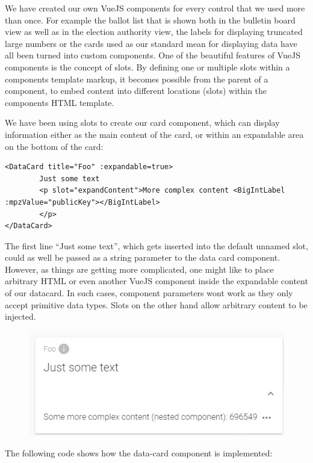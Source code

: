 We have created our own VueJS components for every control that we used more than once. For example the ballot list that is shown both in the bulletin board view as well as in the election authority view, the labels for displaying truncated large numbers or the cards used as our standard mean for displaying data have all been turned into custom components. One of the beautiful features of VueJS components is the concept of slots. By defining one or multiple slots within a components template markup, it becomes possible from the parent of a component, to embed content into different locations (slots) within the components HTML template.

We have been using slots to create our card component, which can display information either as the main content of the card, or within an expandable area on the bottom of the card:

\begin{verbatim}
<DataCard title="Foo" :expandable=true>
		Just some text
		<p slot="expandContent">More complex content <BigIntLabel :mpzValue="publicKey"></BigIntLabel>
		</p>
</DataCard>
\end{verbatim}
The first line "`Just some text"', which gets inserted into the default unnamed slot, could as well be passed as a string parameter to the data card component. However, as things are getting more complicated, one might like to place arbitrary HTML or even another VueJS component inside the expandable content of our datacard. In such cases, component parameters wont work as they only accept primitive data types. Slots on the other hand allow arbitrary content to be injected.
\begin{figure}[h!]
\begin{center}
\includegraphics[scale=1.0]{assets/datacardexample.PNG}\\
\label{DataCardXample}%
\end{center}
\end{figure}
The following code shows how the data-card component is implemented:

